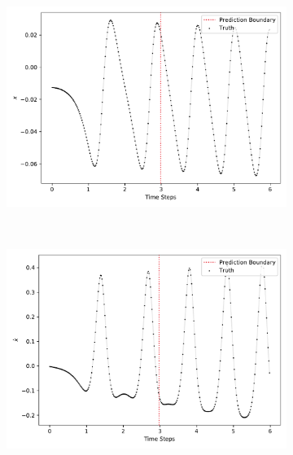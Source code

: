			\begin{figure}
				\centering
				\begin{subfigure}{0.5\linewidth}
					\centering
					\includegraphics[width=\linewidth]{figures/experiments/environments/observations-cartpole-gym-N0-D0.pdf}
				\end{subfigure}%
				~
				\begin{subfigure}{0.5\linewidth}
					\centering
					\includegraphics[width=\linewidth]{figures/experiments/environments/observations-cartpole-gym-N0-D1.pdf}
				\end{subfigure} \\
				\begin{subfigure}{0.5\linewidth}
					\centering

\end{subfigure}
\end{figure}
